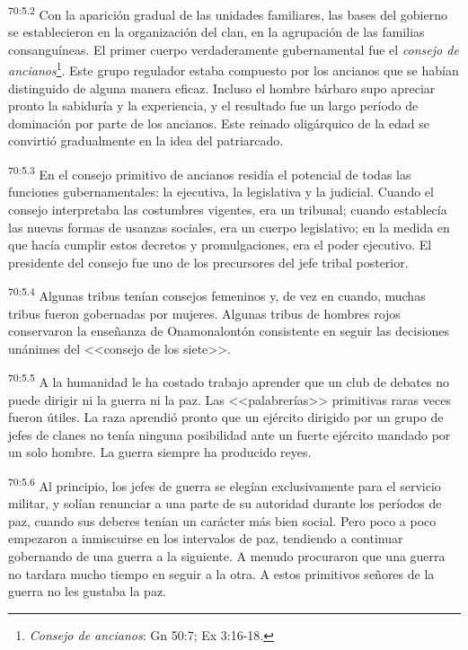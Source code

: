 \documentclass[twoside, 11pt]{book}
\begin{document}
\par
\textsuperscript{70:5.2} Con la aparición gradual de las unidades familiares, las bases del gobierno se establecieron en la organización del clan, en la agrupación de las familias consanguíneas. El primer cuerpo verdaderamente gubernamental fue el \textit{consejo de ancianos}\footnote{\textit{Consejo de ancianos}: Gn 50:7; Ex 3:16-18.}. Este grupo regulador estaba compuesto por los ancianos que se habían distinguido de alguna manera eficaz. Incluso el hombre bárbaro supo apreciar pronto la sabiduría y la experiencia, y el resultado fue un largo período de dominación por parte de los ancianos. Este reinado oligárquico de la edad se convirtió gradualmente en la idea del patriarcado.

\par
\textsuperscript{70:5.3} En el consejo primitivo de ancianos residía el potencial de todas las funciones gubernamentales: la ejecutiva, la legislativa y la judicial. Cuando el consejo interpretaba las costumbres vigentes, era un tribunal; cuando establecía las nuevas formas de usanzas sociales, era un cuerpo legislativo; en la medida en que hacía cumplir estos decretos y promulgaciones, era el poder ejecutivo. El presidente del consejo fue uno de los precursores del jefe tribal posterior.

\par
\textsuperscript{70:5.4} Algunas tribus tenían consejos femeninos y, de vez en cuando, muchas tribus fueron gobernadas por mujeres. Algunas tribus de hombres rojos conservaron la enseñanza de Onamonalontón consistente en seguir las decisiones unánimes del <<consejo de los siete>>.

\par
\textsuperscript{70:5.5} A la humanidad le ha costado trabajo aprender que un club de debates no puede dirigir ni la guerra ni la paz. Las <<palabrerías>> primitivas raras veces fueron útiles. La raza aprendió pronto que un ejército dirigido por un grupo de jefes de clanes no tenía ninguna posibilidad ante un fuerte ejército mandado por un solo hombre. La guerra siempre ha producido reyes.

\par
\textsuperscript{70:5.6} Al principio, los jefes de guerra se elegían exclusivamente para el servicio militar, y solían renunciar a una parte de su autoridad durante los períodos de paz, cuando sus deberes tenían un carácter más bien social. Pero poco a poco empezaron a inmiscuirse en los intervalos de paz, tendiendo a continuar gobernando de una guerra a la siguiente. A menudo procuraron que una guerra no tardara mucho tiempo en seguir a la otra. A estos primitivos señores de la guerra no les gustaba la paz.
\end{document}
